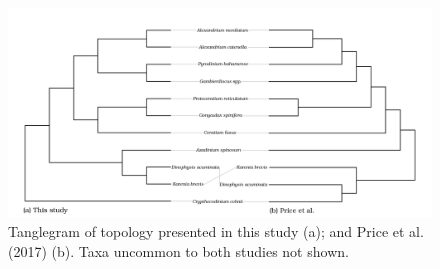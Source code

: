\documentclass[12pt]{article}
\begin{document}
\FloatBarrier 
\begin{figure} 
\includegraphics[scale=.23]{Price-comparison.png} 
\caption{Tanglegram of topology presented in this study (a); and Price et al. (2017) (b). Taxa uncommon to both studies not shown.} 
\label{fig:tangle}
\end{figure} 
\FloatBarrier
\end{document}
